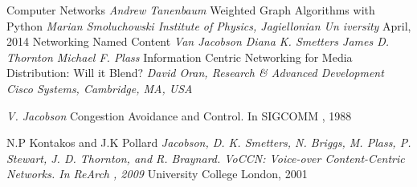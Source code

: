 \documentclass[11pt, oneside]{Thesis} %
\begin{document}
\begin{thebibliography}{9}

Computer Networks
\textit{Andrew Tanenbaum}%
Weighted Graph Algorithms with Python
\textit{Marian Smoluchowski Institute of Physics, Jagiellonian Un
iversity} April, 2014
%
Networking Named Content
\textit{Van Jacobson
Diana K. Smetters
James D. Thornton
Michael F. Plass}
%
Information Centric Networking for Media Distribution: 
Will it Blend?
\textit{David Oran, Research \& Advanced Development 
Cisco Systems, Cambridge, MA, USA}

\textit{V. Jacobson}
Congestion Avoidance and Control. In
SIGCOMM
, 1988



N.P Kontakos and J.K Pollard
\textit{ Jacobson, D. K. Smetters, N. Briggs, M. Plass, P. Stewart, J. D. Thornton, and R. Braynard. VoCCN: Voice-over Content-Centric Networks. In ReArch
, 2009} University College London, 2001
%
%
%
%
%
%
%


\end{thebibliography}
\end{document}
